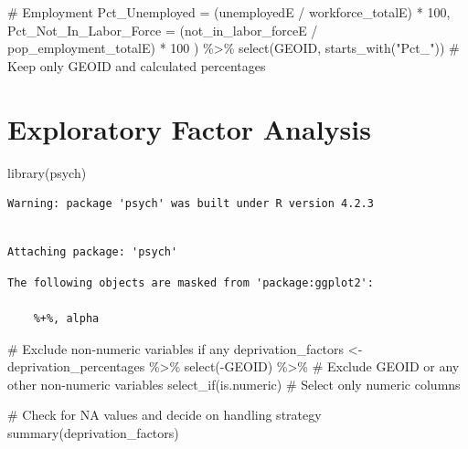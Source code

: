 \documentclass[
  letterpaper,
  DIV=11,
  numbers=noendperiod]{scrreprt}
\newenvironment{Shaded}{\begin{snugshade}}{\end{snugshade}}
\newcommand{\AttributeTok}[1]{\textcolor[rgb]{0.40,0.45,0.13}{#1}}
\newcommand{\CommentTok}[1]{\textcolor[rgb]{0.37,0.37,0.37}{#1}}
\newcommand{\DecValTok}[1]{\textcolor[rgb]{0.68,0.00,0.00}{#1}}
\newcommand{\FunctionTok}[1]{\textcolor[rgb]{0.28,0.35,0.67}{#1}}
\newcommand{\NormalTok}[1]{\textcolor[rgb]{0.00,0.23,0.31}{#1}}
\newcommand{\OtherTok}[1]{\textcolor[rgb]{0.00,0.23,0.31}{#1}}
\newcommand{\SpecialCharTok}[1]{\textcolor[rgb]{0.37,0.37,0.37}{#1}}
\newcommand{\StringTok}[1]{\textcolor[rgb]{0.13,0.47,0.30}{#1}}
\begin{document}
\begin{Shaded}
\begin{Highlighting}[]
    \CommentTok{\# Employment}
    \AttributeTok{Pct\_Unemployed =}\NormalTok{ (unemployedE }\SpecialCharTok{/}\NormalTok{ workforce\_totalE) }\SpecialCharTok{*} \DecValTok{100}\NormalTok{,}
    \AttributeTok{Pct\_Not\_In\_Labor\_Force =}\NormalTok{ (not\_in\_labor\_forceE }\SpecialCharTok{/}\NormalTok{ pop\_employment\_totalE) }\SpecialCharTok{*} \DecValTok{100}
\NormalTok{  ) }\SpecialCharTok{\%\textgreater{}\%}
  \FunctionTok{select}\NormalTok{(GEOID, }\FunctionTok{starts\_with}\NormalTok{(}\StringTok{"Pct\_"}\NormalTok{))  }\CommentTok{\# Keep only GEOID and calculated percentages}
\end{Highlighting}
\end{Shaded}

\section{Exploratory Factor Analysis}\label{exploratory-factor-analysis}

\begin{Shaded}
\begin{Highlighting}[]
\FunctionTok{library}\NormalTok{(psych)}
\end{Highlighting}
\end{Shaded}

\begin{verbatim}
Warning: package 'psych' was built under R version 4.2.3
\end{verbatim}

\begin{verbatim}

Attaching package: 'psych'
\end{verbatim}

\begin{verbatim}
The following objects are masked from 'package:ggplot2':

    %+%, alpha
\end{verbatim}

\begin{Shaded}
\begin{Highlighting}[]
\CommentTok{\# Exclude non{-}numeric variables if any}
\NormalTok{deprivation\_factors }\OtherTok{\textless{}{-}}\NormalTok{ deprivation\_percentages }\SpecialCharTok{\%\textgreater{}\%} 
  \FunctionTok{select}\NormalTok{(}\SpecialCharTok{{-}}\NormalTok{GEOID) }\SpecialCharTok{\%\textgreater{}\%}  \CommentTok{\# Exclude GEOID or any other non{-}numeric variables}
  \FunctionTok{select\_if}\NormalTok{(is.numeric)  }\CommentTok{\# Select only numeric columns}

\CommentTok{\# Check for NA values and decide on handling strategy}
\FunctionTok{summary}\NormalTok{(deprivation\_factors)}
\end{Highlighting}
\end{Shaded}
\end{document}
